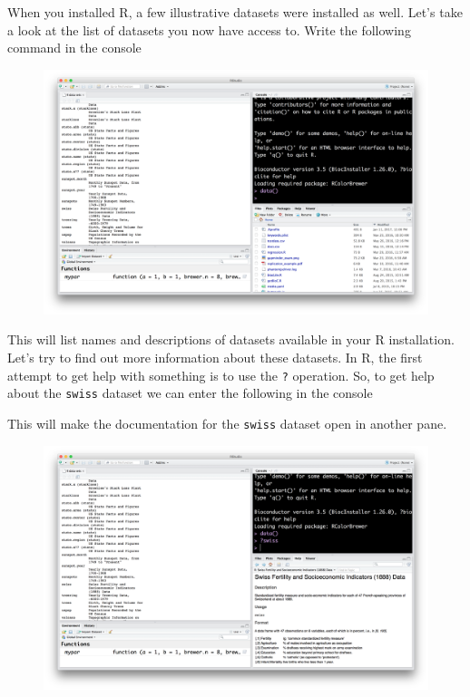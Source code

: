 \documentclass[12pt,]{book}
\theoremstyle{definition}
\theoremstyle{definition}
\theoremstyle{definition}
\theoremstyle{remark}
\begin{document}
When you installed R, a few illustrative datasets were installed as
well. Let's take a look at the list of datasets you now have access to.
Write the following command in the console

\begin{figure}
\centering
\includegraphics{img/rstudio_data.png}
\caption{}
\end{figure}

This will list names and descriptions of datasets available in your R
installation. Let's try to find out more information about these
datasets. In R, the first attempt to get help with something is to use
the \texttt{?} operation. So, to get help about the \texttt{swiss}
dataset we can enter the following in the console

This will make the documentation for the \texttt{swiss} dataset open in
another pane.

\begin{figure}
\centering
\includegraphics{img/rstudio_swiss.png}
\caption{}
\end{figure}
\end{document}
